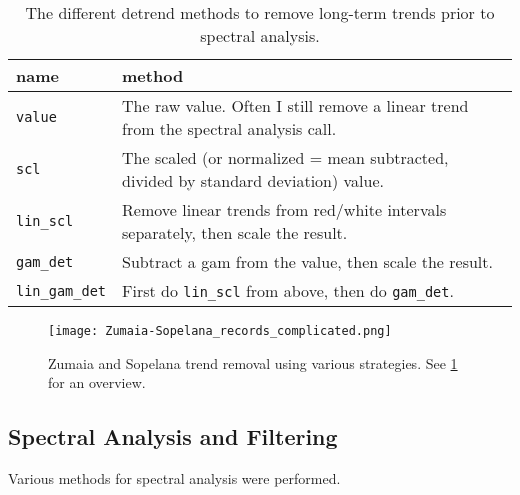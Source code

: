 \documentclass[draft]{agujournal2019}
\begin{document}
\begin{table}[htbp]
\caption{\label{tab:detrend_types}The different detrend methods to remove long-term trends prior to spectral analysis.}
\centering
\begin{tabular}{ll}
name & method\\
\hline
\texttt{value} & The raw value. Often I still remove a linear trend from the spectral analysis call.\\
\texttt{scl} & The scaled (or normalized = mean subtracted, divided by standard deviation) value.\\
\texttt{lin\_scl} & Remove linear trends from red/white intervals separately, then scale the result.\\
\texttt{gam\_det} & Subtract a gam from the value, then scale the result.\\
\texttt{lin\_gam\_det} & First do \texttt{lin\_scl} from above, then do \texttt{gam\_det}.\\
\end{tabular}
\end{table}

\begin{figure}[htbp]
\centering
\texttt{[image: Zumaia-Sopelana\_records\_complicated.png]}
\caption{\label{fig:detrend}Zumaia and Sopelana trend removal using various strategies. See \cref{tab:detrend_types} for an overview.}
\end{figure}






\subsection{Spectral Analysis and Filtering}\label{sec:spectral}
Various methods for spectral analysis were performed.
\end{document}
